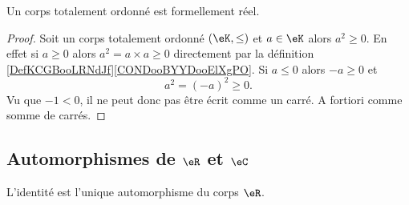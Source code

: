 \begin{proposition}
    Un corps totalement ordonné est formellement réel.
\end{proposition}

\begin{proof}
    Soit un corps totalement ordonné \( (\eK,\leq)\) et \( a\in \eK\) alors \( a^2\geq 0\). En effet si \( a\geq 0\) alors \( a^2=a\times a\geq 0\) directement par la définition \ref{DefKCGBooLRNdJf}\ref{CONDooBYYDooElXgPO}. Si \( a\leq 0\) alors \( -a\geq 0\) et
    \begin{equation}
        a^2=(-a)^2\geq 0.
    \end{equation}
    Vu que \( -1<0\), il ne peut donc pas être écrit comme un carré. A fortiori comme somme de carrés.
\end{proof}

\subsection{Automorphismes de \( \eR\) et \( \eC\)}

\begin{proposition}     \label{PROPooLLPMooIVanaO}
    L'identité est l'unique automorphisme du corps \( \eR\).
\end{proposition}

